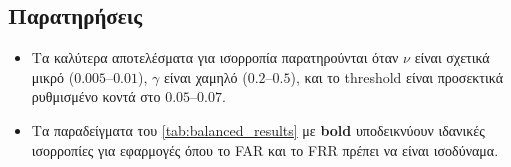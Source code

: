 \subsection{Παρατηρήσεις}
\begin{itemize}
    \item Τα καλύτερα αποτελέσματα για ισορροπία παρατηρούνται όταν $\nu$ είναι σχετικά μικρό ($0.005$–$0.01$), $\gamma$ είναι χαμηλό ($0.2$–$0.5$), και το threshold είναι προσεκτικά ρυθμισμένο κοντά στο $0.05$–$0.07$.
    \item Τα παραδείγματα του \autoref{tab:balanced_results} με \textbf{bold} υποδεικνύουν ιδανικές ισορροπίες για εφαρμογές όπου το FAR και το FRR πρέπει να είναι ισοδύναμα.
\end{itemize}
